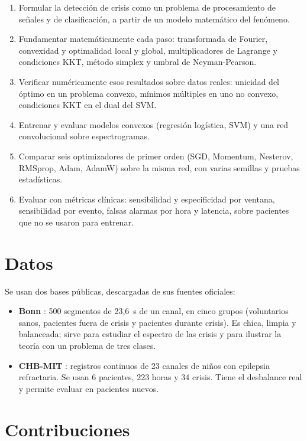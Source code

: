 \begin{enumerate}
  \item Formular la detección de crisis como un problema de procesamiento de señales y de clasificación, a partir de un
        modelo matemático del fenómeno.
  \item Fundamentar matemáticamente cada paso: transformada de Fourier, convexidad y optimalidad local y global,
        multiplicadores de Lagrange y condiciones KKT, método simplex y umbral de Neyman-Pearson.
  \item Verificar numéricamente esos resultados sobre datos reales: unicidad del óptimo en un problema convexo, mínimos
        múltiples en uno no convexo, condiciones KKT en el dual del SVM.
  \item Entrenar y evaluar modelos convexos (regresión logística, SVM) y una red convolucional sobre espectrogramas.
  \item Comparar seis optimizadores de primer orden (SGD, Momentum, Nesterov, RMSprop, Adam, AdamW) sobre la misma red, con
        varias semillas y pruebas estadísticas.
  \item Evaluar con métricas clínicas: sensibilidad y especificidad por ventana, sensibilidad por evento, falsas alarmas
        por hora y latencia, sobre pacientes que no se usaron para entrenar.
\end{enumerate}

\section{Datos}

Se usan dos bases públicas, descargadas de sus fuentes oficiales:
\begin{itemize}
  \item \textbf{Bonn} \parencite{andrzejak2001}: 500 segmentos de 23,6~s de un canal, en cinco grupos (voluntarios sanos,
        pacientes fuera de crisis y pacientes durante crisis). Es chica, limpia y balanceada; sirve para estudiar el
        espectro de las crisis y para ilustrar la teoría con un problema de tres clases.
  \item \textbf{CHB-MIT} \parencite{shoeb2009,goldberger2000}: registros continuos de 23 canales de niños con epilepsia
        refractaria. Se usan 6 pacientes, 223 horas y 34 crisis. Tiene el desbalance real y permite evaluar en pacientes
        nuevos.
\end{itemize}

\section{Contribuciones}

